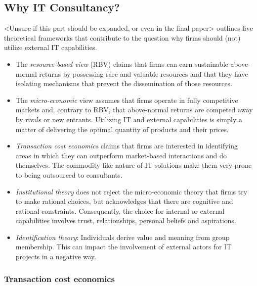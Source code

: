 \documentclass[12pt]{article}
\providecommand{\tightlist}{%
  \setlength{\itemsep}{0pt}\setlength{\parskip}{0pt}}
\begin{document}
\hypertarget{why-it-consultancy}{%
\subsection{Why IT Consultancy?}\label{why-it-consultancy}}

\textless Unsure if this part should be expanded, or even in the final
paper\textgreater{} \citet[8-10]{nevo2007} outlines five theoretical
frameworks that contribute to the question why firms should (not)
utilize external IT capabilities.

\begin{itemize}
\tightlist
\item
  The \emph{resource-based view} (RBV) claims that firms can earn
  sustainable above-normal returns by possessing rare and valuable
  resources and that they have isolating mechanisms that prevent the
  dissemination of those resources.
\item
  The \emph{micro-economic} view assumes that firms operate in fully
  competitive markets and, contrary to RBV, that above-normal returns
  are competed away by rivals or new entrants. Utilizing IT and external
  capabilities is simply a matter of delivering the optimal quantity of
  products and their prices.
\item
  \emph{Transaction cost economics} claims that firms are interested in
  identifying areas in which they can outperform market-based
  interactions and do themselves. The commodity-like nature of IT
  solutions make them very prone to being outsourced to consultants.
\item
  \emph{Institutional theory} does not reject the micro-economic theory
  that firms try to make rational choices, but acknowledges that there
  are cognitive and rational constraints. Consequently, the choice for
  internal or external capabilities involves trust, relationships,
  personal beliefs and aspirations.
\item
  \emph{Identification theory}: Individuals derive value and meaning
  from group membership. This can impact the involvement of external
  actors for IT projects in a negative way.
\end{itemize}

\hypertarget{transaction-cost-economics}{%
\subsubsection{Transaction cost
economics}\label{transaction-cost-economics}}
\end{document}
